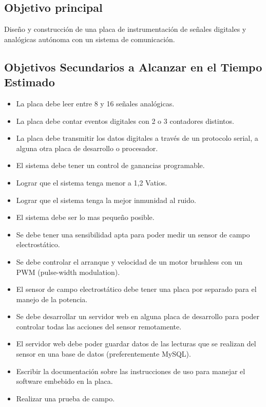 \subsection{Objetivo principal} %
\label{sec:objetivo_principal}

Diseño y construcción de una placa de instrumentación de señales digitales y analógicas autónoma con un sistema de comunicación.


\subsection{Objetivos Secundarios a Alcanzar en el Tiempo Estimado} %
\label{sec: objetivos_secundarios}

\begin{itemize}
	\item La placa debe leer entre 8 y 16 señales analógicas.
    \item La placa debe contar eventos digitales con 2 o 3 contadores distintos.
    \item La placa debe transmitir los datos digitales a través de un protocolo serial, a alguna otra placa de desarrollo o procesador.
    \item El sistema debe tener un control de ganancias programable.
    \item Lograr que el sistema tenga menor a 1,2 Vatios.
    \item Lograr que el sistema tenga la mejor inmunidad al ruido.
    \item El sistema debe ser lo mas pequeño posible.
    \item Se debe tener una sensibilidad apta para poder medir un sensor de campo electrostático.
    \item Se debe controlar el arranque y velocidad de un motor brushless con un PWM (pulse-width modulation).
    \item El sensor de campo electrostático debe tener una placa por separado para el manejo de la potencia.
    \item Se debe desarrollar un servidor web en alguna placa de desarrollo para poder controlar todas las acciones del sensor remotamente.
    \item El servidor web debe poder guardar datos de las lecturas que se realizan del sensor en una base de datos (preferentemente MySQL).
    \item Escribir la documentación sobre las instrucciones de uso para manejar el software embebido en la placa.
    \item Realizar una prueba de campo.
\end{itemize}

